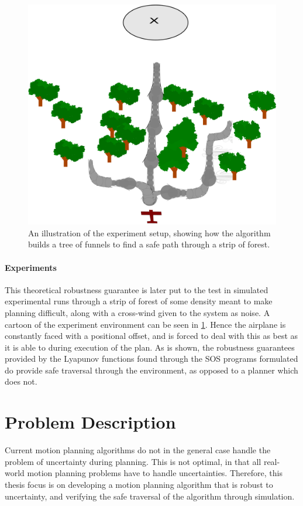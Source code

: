 \begin{figure}
  \centering
  \includegraphics[width=.8\textwidth]{figures/experiments/experiment-airplane-strip}
  \caption[The experiment setup visualized]{An illustration of the experiment
    setup, showing how the \rrtfunnel{} algorithm builds a tree of funnels to
    find a safe path through a strip of forest.}
  \label{fig:experiments-cartoon}
\end{figure}

\paragraph{Experiments}
This theoretical robustness guarantee is later put to the test in simulated
experimental runs through a strip of forest of some density meant to make
planning difficult, along with a cross-wind given to the system as noise. A
cartoon of the experiment environment can be seen in
\cref{fig:experiments-cartoon}. Hence the airplane is constantly faced with a
positional offset, and is forced to deal with this as best as it is able to
during execution of the plan. As is shown, the robustness guarantees provided by
the Lyapunov functions found through the \ac{SOS} programs formulated do provide
safe traversal through the environment, as opposed to a planner which does not.

\section{Problem Description}

Current motion planning algorithms do not in the general case handle the problem
of uncertainty during planning. This is not optimal, in that all real-world
motion planning problems have to handle uncertainties. Therefore, this thesis
focus is on developing a motion planning algorithm that is robust to
uncertainty, and verifying the safe traversal of the algorithm through
simulation.

